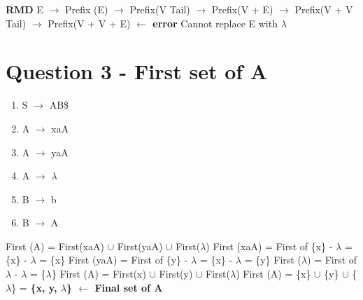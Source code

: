 \documentclass{report}
\begin{document}
\noindent\textbf{RMD}\newline
E $\rightarrow$ Prefix (E) $\rightarrow$ Prefix(V Tail) $\rightarrow$ Prefix(V + E)
$\rightarrow$ Prefix(V + V Tail) $\rightarrow$ Prefix(V + V + E) \textbf{$\leftarrow$ error}\newline
Cannot replace E with $\lambda$

\newpage
\section{Question 3 - First set of A}
\vspace{-1em}
\begin{multicols}{2}
  \begin{enumerate}
    \setlength\itemsep{-.25em}
    \item S $\rightarrow$ AB\$
    \item A $\rightarrow$ xaA
    \item A $\rightarrow$ yaA
    \item A $\rightarrow$ $\lambda$
    \item B $\rightarrow$ b
    \item B $\rightarrow$ A\newline
  \end{enumerate}
\setlength{\leftskip}{-12em}
First (A) = First(xaA) $\cup$  First(yaA) $\cup$  First($\lambda$)\newline
\indent\hspace{.25cm}First (xaA) = First of \{x\} - $\lambda$ = \{x\} - $\lambda$ = \{x\}\newline
\indent\hspace{.25cm}First (yaA) = First of \{y\} - $\lambda$ = \{x\} - $\lambda$ = \{y\}\newline
\indent\hspace{.25cm}First ($\lambda$) = First of {$\lambda$} - $\lambda$ = \{$\lambda$\}\newline
First (A) = First(x) $\cup$  First(y) $\cup$  First($\lambda$)\newline
First (A) = \{x\} $\cup$  \{y\} $\cup$  \{$\lambda$\} = \textbf{\{x, y, $\lambda$\} $\leftarrow$ Final set of A}
\end{multicols}
\end{document}
